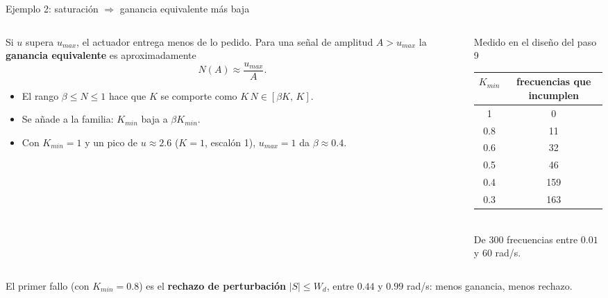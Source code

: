 \documentclass[aspectratio=169,11pt]{beamer}
\begin{document}
\begin{frame}{Ejemplo 2: saturación $\Rightarrow$ ganancia equivalente más baja}
  \small
  \begin{columns}[T]
  \begin{column}{0.5\textwidth}
    Si $u$ supera $u_{max}$, el actuador entrega menos de lo pedido. Para una señal de amplitud $A>u_{max}$ la \textbf{ganancia equivalente} es aproximadamente
    \[ N(A)\approx\frac{u_{max}}{A}. \]
    \begin{itemize}
      \item El rango $\beta\le N\le1$ hace que $K$ se comporte como $K\,N\in[\beta K,\,K]$.
      \item Se añade a la familia: $K_{min}$ baja a $\beta K_{min}$.
      \item Con $K_{min}=1$ y un pico de $u\approx2.6$ ($K=1$, escalón 1), $u_{max}=1$ da $\beta\approx0.4$.
    \end{itemize}
  \end{column}
  \begin{column}{0.46\textwidth}
    \begin{block}{Medido en el diseño del paso 9}
      \footnotesize
      \begin{tabular}{c|c}
        $K_{min}$ & frecuencias que incumplen\\\hline
        1 & 0\\
        0.8 & 11\\
        0.6 & 32\\
        0.5 & 46\\
        0.4 & 159\\
        0.3 & 163
      \end{tabular}
      \\[2pt]
      \scriptsize De 300 frecuencias entre $0.01$ y $60$ rad/s.
    \end{block}
  \end{column}
  \end{columns}
  \vspace{2pt}
  \footnotesize El primer fallo (con $K_{min}=0.8$) es el \textbf{rechazo de perturbación} $|S|\le W_d$, entre $0.44$ y $0.99$ rad/s: menos ganancia, menos rechazo.
\end{frame}
\end{document}
